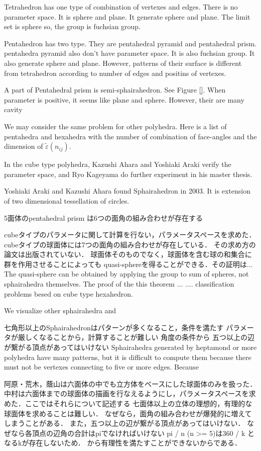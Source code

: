 \documentclass[dvipdfmx]{interact}
\theoremstyle{plain}%
\theoremstyle{definition}
\theoremstyle{remark}
\theoremstyle{problemstyle}
\begin{document}
Tetrahedron has one type of combination of vertexes and edges.
There is no parameter space.
It is sphere and plane.
It generate sphere and plane. The limit set is sphere so, the group is
fuchsian group.

Pentahedron has two type. They are pentahedral pyramid and pentahedral prism.
pentahedra pyramid also don't have parameter space.
It is also fuchsian group.
It also generate sphere and plane. However, patterns of their surface is
different from tetrahedron according to number of edges and positins of
vertexes.

A part of Pentahedral prism is semi-sphairahedron.
See Figure \ref{}. When parameter is positive, it seems like plane and
sphere. However, their are many cavity

We may consider the same problem for other polyhedra. Here is a list of
pentahedra and hexahedra with the number of combination of face-angles
and the dimension of $\tilde{\varepsilon}(n_{ij})$.

In the cube type polyhedra, Kazushi Ahara and Yoshiaki Araki
verify the parameter space, and Ryo Kageyama do further experiment in
his master thesis\cite{kageyama}. 

Yoshiaki Araki and Kazushi Ahara found Sphairahedron in 2003.
It is extension of two dimensional tessellation of circles.

5面体のpentahedral prism は6つの面角の組み合わせが存在する

cubeタイプのパラメータに関して計算を行ない，パラメータスペースを求めた．
cubeタイプの球面体には7つの面角の組み合わせが存在している．
その求め方の論文は出版されていない．
球面体そのものでなく，球面体を含む球の和集合に群を作用させることによっても
quasi-sphereを得ることができる．その証明は...
The quasi-sphere can be obtained by applying the group to sum of
spheres, not sphairahedra themselves.
The proof of the this theorem ... ....
classification problems besed on cube type hexahedron.

We visualize other sphairahedra and 

七角形以上のSphairahedronはパターンが多くなること，条件を満たす
パラメータが厳しくなることから，計算することが難しい
角度の条件から
五つ以上の辺が繋がる頂点があってはいけない
Sphairahedra generated by heptamond or more polyhedra have many
patterns, but it is difficult to compute them 
because there must not be vertexes connecting to five or more edges.
Because 

阿原・荒木，蔭山は六面体の中でも立方体をベースにした球面体のみを扱った．
中村は六面体までの球面体の描画を行なえるようにし，パラメータスペースを求
めた．ここではそれらについて記述する
七面体以上の立体の理想的，有理的な球面体を求めることは難しい．
なぜなら，面角の組み合わせが爆発的に増えてしまうことがある．
また，五つ以上の辺が繋がる頂点があってはいけない．
なぜなら各頂点の辺角の合計はpiでなければいけない
pi / n (n >= 5)は360 / k となるkが存在しないため．
から有理性を満たすことができないからである．
\end{document}
